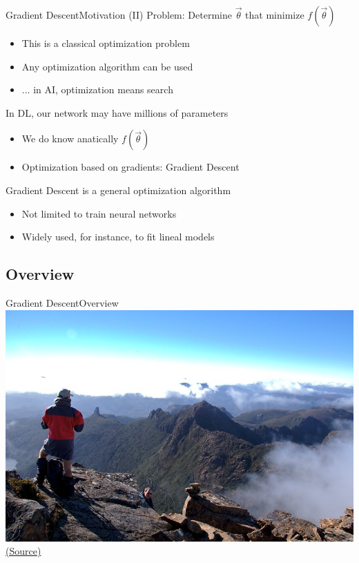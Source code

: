 \documentclass[10pt,compress]{beamer} %
\begin{document}
\begin{frame}{Gradient Descent}{Motivation (II)}
	Problem: Determine $\vec{\theta}$ that minimize $f(\vec{\theta})$
	\begin{itemize}
		\item This is a classical optimization problem
		\item Any optimization algorithm can be used
		\item ... in AI, optimization means search
	\end{itemize}

	In DL, our network may have millions of parameters
	\begin{itemize}
		\item We do know anatically $f(\vec{\theta})$
		\item Optimization based on gradients: \alert{Gradient Descent}
	\end{itemize}
	Gradient Descent is a general optimization algorithm
	\begin{itemize}
		\item Not limited to train neural networks
		\item Widely used, for instance, to fit lineal models
	\end{itemize}
\end{frame}

\subsection{Overview}

{\blackSlide
\begin{frame}[plain]{Gradient Descent}{Overview}
	\centering\includegraphics[width=\linewidth]{figs/mountain.jpg}\\
	\scriptsize\href{https://flickr.com/photos/pnglife/2362494258/in/photolist-8vGnwi-Mp7XNw-ozKpZv-4ALpeC-axW8KB-23DBJYt-frJNKt-yzPoCX-4LqDab-axf3zv-or4KtC-oqHW4q-axf5yp-23YRq9h-VNJWrs-8McrVM-dNbJXY-5sDfpy-o3SjX-qF1rGP-cfAqTh-YhNXcj-pECdqe-cfAqLE-BRziN1-22w1wBv-6rR9NW-f5iic4-82Vd2C-hzy676-HG1zW6-pT8N-RDfrcf-axf8x8-WKv575-w9JSfr-pT4H-bNwyCT-Cxjb7-bUef42-frJQ4v-Am2QCd-axXouW-axhMph-VqaQum-g78JD3-qtRE5V-egjam3-f9YgJ4-SVGSpe/}{(Source)}
\end{frame}
}
\end{document}
